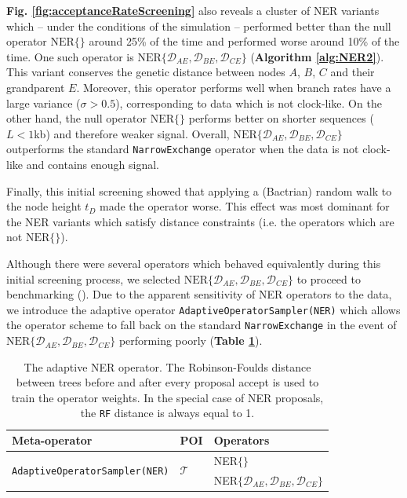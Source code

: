 \documentclass[10pt,letterpaper]{article}
\begin{document}
\textbf{Fig. \ref{fig:acceptanceRateScreening}} also reveals a cluster of NER variants which -- under the conditions of the simulation --  performed better than the null operator $\text{NER}\{\}$ around 25\% of the time and performed worse around 10\% of the time. 
One such operator is  $\text{NER}\{\mathcal{D}_{AE}, \mathcal{D}_{BE}, \mathcal{D}_{CE}\}$  (\textbf{Algorithm \ref{alg:NER2}}). 
This variant conserves the genetic distance between nodes $A$, $B$, $C$ and their grandparent $E$. 
Moreover, this operator performs well when branch rates have a large variance ($\sigma > 0.5$), corresponding to data which is not clock-like. 
On the other hand, the null operator $\text{NER}\{\}$ performs better on shorter sequences ($L < 1$kb) and therefore weaker signal.  
Overall, $\text{NER}\{\mathcal{D}_{AE}, \mathcal{D}_{BE}, \mathcal{D}_{CE}\}$ outperforms the standard \texttt{NarrowExchange} operator when the data is not clock-like and contains enough signal. 



Finally, this initial screening showed that applying a (Bactrian) random walk to the node height $t_D$ made the operator worse.
This effect was most dominant for the NER variants which satisfy distance constraints (i.e. the operators which are not $\text{NER}\{\}$).




Although there were several operators which behaved equivalently during this initial screening process, we selected $\text{NER}\{\mathcal{D}_{AE}, \mathcal{D}_{BE}, \mathcal{D}_{CE}\}$ to proceed to benchmarking (\textbf{}).
Due to the apparent sensitivity of NER operators to the data, we introduce the adaptive operator \texttt{AdaptiveOperatorSampler(NER)} which allows the operator scheme to fall back on the standard \texttt{NarrowExchange} in the event of $\text{NER}\{\mathcal{D}_{AE}, \mathcal{D}_{BE}, \mathcal{D}_{CE}\}$ performing poorly (\textbf{Table \ref{table:adaptiveNER}}).





\begin{table}[h!]
\centering
\begin{tabular}{|l l l|} 
 \hline
 Meta-operator & POI & Operators \\
\hline
 \multirow{2}{*}{\texttt{AdaptiveOperatorSampler(NER)}} & \multirow{2}{*}{$\mathcal{T}$} & NER$\{  \}$ \\ 
 && NER$\{ \mathcal{D}_{AE}, \mathcal{D}_{BE}, \mathcal{D}_{CE} \}$ \\
 \hline
\end{tabular}
\caption{The adaptive NER operator. 
The Robinson-Foulds distance between trees before and after every proposal accept is used to train the operator weights. In the special case of NER proposals, the \texttt{RF} distance is always equal to 1. }
\label{table:adaptiveNER}
\end{table}
\end{document}
